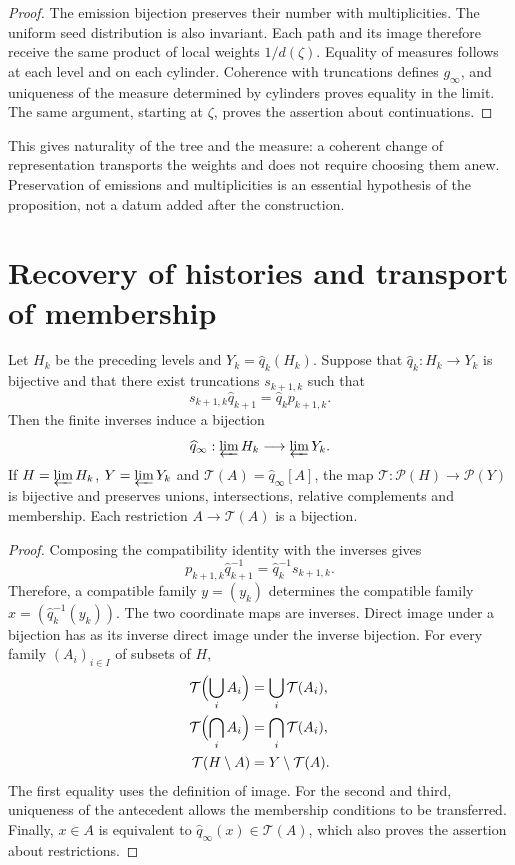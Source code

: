 \begin{proof}
The emission bijection preserves their number with multiplicities. The
uniform seed distribution is also invariant. Each path
and its image therefore receive the same product of local weights
\(1/d(\zeta)\). Equality of measures follows at each level and on
each cylinder. Coherence with truncations defines \(g_\infty\),
and uniqueness of the measure determined by cylinders proves equality
in the limit. The same argument, starting at \(\zeta\), proves the
assertion about continuations.
\end{proof}

This gives naturality of the tree and the measure: a coherent change
of representation transports the weights and does not require choosing them anew.
Preservation of emissions and multiplicities is an essential hypothesis of
the proposition, not a datum added after the construction.

\section{Recovery of histories and transport of membership}
\begin{proposition}
\label{x_reciprocidad:lib07:prop-familias}
Let \(H_k\) be the preceding levels and \(Y_k=\widehat q_k(H_k)\).
Suppose that \(\widehat q_k:H_k\to Y_k\) is bijective and that there exist
truncations \(s_{k+1,k}\) such that
\[
 s_{k+1,k}\widehat q_{k+1}=\widehat q_k p_{k+1,k}.
\]
Then the finite inverses induce a bijection
\[
 \widehat q_\infty:\varprojlim H_k\longrightarrow\varprojlim Y_k.
\]
If \(H=\varprojlim H_k\), \(Y=\varprojlim Y_k\) and
\(\mathcal T(A)=\widehat q_\infty[A]\), the map
\(\mathcal T:\mathcal P(H)\to\mathcal P(Y)\) is bijective and
preserves unions, intersections, relative complements and membership.
Each restriction \(A\to\mathcal T(A)\) is a bijection.
\end{proposition}
\begin{proof}
Composing the compatibility identity with the inverses gives
\[
 p_{k+1,k}\widehat q_{k+1}^{-1}
   =\widehat q_k^{-1}s_{k+1,k}.
\]
Therefore, a compatible family \(y=(y_k)\) determines the compatible
family \(x=(\widehat q_k^{-1}(y_k))\). The two coordinate
maps are inverses. Direct image under a bijection has
as its inverse direct image under the inverse bijection. For every
family \((A_i)_{i\in I}\) of subsets of \(H\),
\[
 \begin{aligned}
 \mathcal T\Bigl(\bigcup_i A_i\Bigr)&=\bigcup_i\mathcal T(A_i),\\
 \mathcal T\Bigl(\bigcap_i A_i\Bigr)&=\bigcap_i\mathcal T(A_i),\\
 \mathcal T(H\setminus A)&=Y\setminus\mathcal T(A).
 \end{aligned}
\]
The first equality uses the definition of image. For the second and
third, uniqueness of the antecedent allows the membership
conditions to be transferred. Finally,
\(x\in A\) is equivalent to
\(\widehat q_\infty(x)\in\mathcal T(A)\), which also proves
the assertion about restrictions.
\end{proof}

